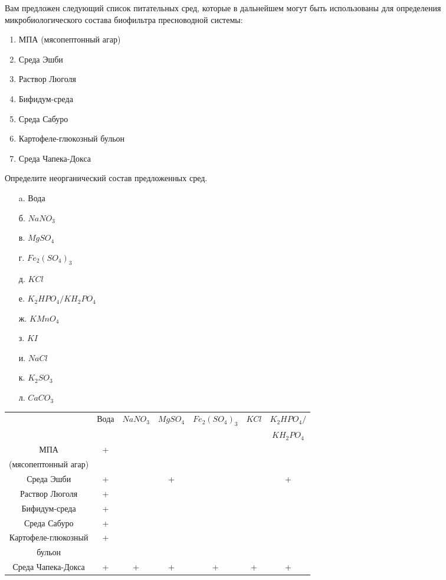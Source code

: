 
Вам предложен следующий список питательных сред, которые в дальнейшем могут быть использованы для определения микробиологического состава биофильтра пресноводной системы:

\begin{enumerate}
    \item МПА (мясопептонный агар)
    \item Среда Эшби
    \item Раствор Люголя
    \item Бифидум-среда
    \item Среда Сабуро
    \item Картофеле-глюкозный бульон
    \item Среда Чапека-Докса
\end{enumerate}

Определите неорганический состав предложенных сред.

\begin{enumerate}
    \item[a.] Вода
    \item[б.] $NaNO_3$
    \item[в.] $MgSO_4$
    \item[г.] $Fe_2(SO_4)_3$
    \item[д.] $KCl$
    \item[е.] $K_2HPO_4 / KH_2PO_4$
    \item[ж.] $KMnO_4$
    \item[з.] $KI$
    \item[и.] $NaCl$
    \item[к.] $K_2SO_3$
    \item[л.] $CaCO_3$
\end{enumerate}

\newpage

\begin{table}[h]
\small
\begin{tabular}{|c|c|c|c|c|c|c|}
    \hline 
    & Вода & $NaNO_3$ & $MgSO_4$ & $Fe_2(SO_4)_3$ & $KCl$ & $K_2HPO_4 /$ \\
    & & & & & & $KH_2PO_4$ \\
    \hline
    МПА & + & & & & & \\
    (мясопептонный агар) &  & & & & & \\
    \hline
    Среда Эшби & + & & + & & & + \\
    \hline
    Раствор Люголя & + & & & & &\\
    \hline
    Бифидум-среда & + & & & & &\\
    \hline
    Среда Сабуро & + & & & & &\\
    \hline
    Картофеле-глюкозный & + & & & & &\\
    бульон & & & & & &\\
    \hline
    Среда Чапека-Докса & + & + & + & + & + & +\\
    \hline
\end{tabular}
\end{table}

